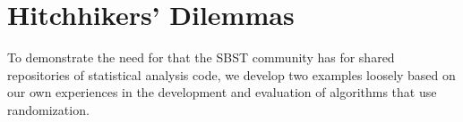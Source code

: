 
\section{Hitchhikers' Dilemmas}
\label{sec:dilemma}

To demonstrate the need for that the SBST community has for shared repositories of statistical analysis code, we develop
two examples loosely based on our own experiences in the development and evaluation of algorithms that use randomization.
